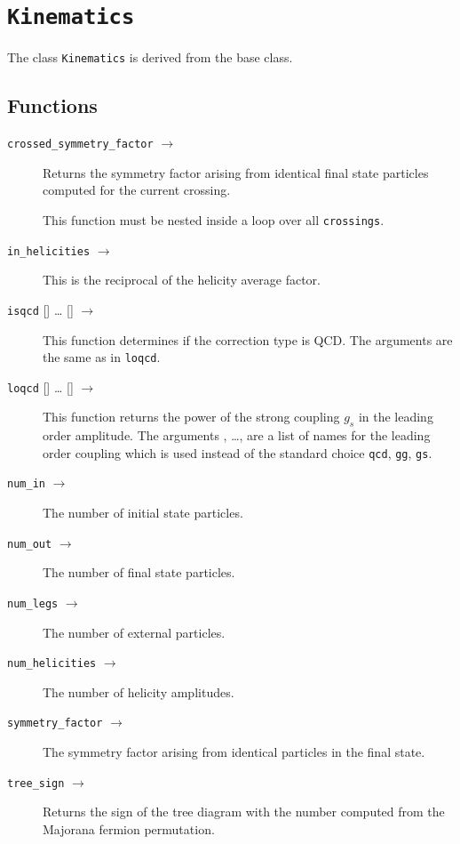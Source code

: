 \documentclass[11pt,a4paper]{refrep}
\begin{document}
\section{\texttt{Kinematics}}
The class \texttt{Kinematics} is derived from the base class.

\subsection{Functions}
\begin{description}
\item[\texttt{crossed\_symmetry\_factor} $\to$ ]
   Returns the symmetry factor arising from identical final state
   particles computed for the current crossing.

\attention This function must be nested inside a loop over all
   \texttt{crossings}.
\item[\texttt{in\_helicities} $\to$ ]
   This is the reciprocal of the helicity average factor.
\item[\texttt{isqcd} {[]} \dots
 {[]} $\to$ ] This function determines
   if the correction type is QCD. The arguments are the same as in
   \texttt{loqcd}.
\item[\texttt{loqcd} {[]} \dots
 {[]} $\to$ ] This function returns the
   power of the strong coupling $g_s$ in the leading order amplitude.
   The arguments , \dots,  are a list of
   names for the leading order coupling which is used instead of the
   standard choice \texttt{qcd}, \texttt{gg}, \texttt{gs}.
\item[\texttt{num\_in} $\to$ ]
   The number of initial state particles.
\item[\texttt{num\_out} $\to$ ]
   The number of final state particles.
\item[\texttt{num\_legs} $\to$ ]
   The number of external particles.
\item[\texttt{num\_helicities} $\to$ ]
   The number of helicity amplitudes.
\item[\texttt{symmetry\_factor} $\to$ ]
   The symmetry factor arising from
   identical particles in the final state.
\item[\texttt{tree\_sign}  $\to$ ]
   Returns the sign of the
   tree diagram with the number  computed from the
   Majorana fermion permutation.
\end{description}
\end{document}
